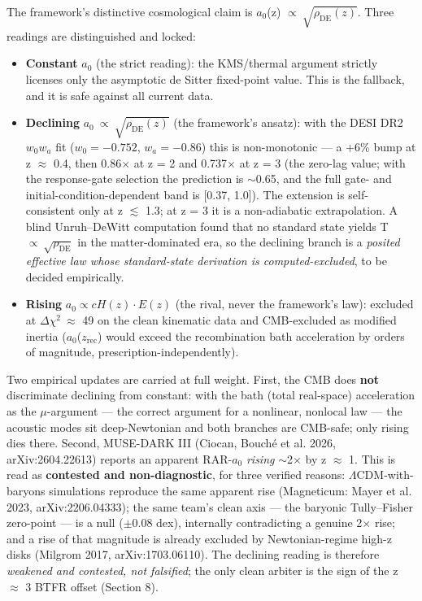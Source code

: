 \documentclass[11pt,a4paper]{article}
\begin{document}
The framework's distinctive cosmological claim is $a_{0}$(z) $\propto\ \sqrt{\rho_{\mathrm{DE}}(z)}$. Three readings are distinguished and locked:

\begin{itemize}
\item \textbf{Constant} $a_{0}$ (the strict reading): the KMS/thermal argument strictly licenses only the asymptotic de Sitter fixed-point value. This is the fallback, and it is safe against all current data.

\item \textbf{Declining} $a_{0}\ \propto\ \sqrt{\rho_{\mathrm{DE}}(z)}$ (the framework's ansatz): with the DESI DR2 $w_0w_a$ fit ($w_0 = -0.752$, $w_a = -0.86$) this is non-monotonic --- a +6\% bump at z $\approx$ 0.4, then 0.86$\times$ at z = 2 and 0.737$\times$ at z = 3 (the zero-lag value; with the response-gate selection the prediction is $\sim$0.65, and the full gate- and initial-condition-dependent band is [0.37, 1.0]). The extension is self-consistent only at z $\lesssim$ 1.3; at z = 3 it is a non-adiabatic extrapolation. A blind Unruh--DeWitt computation found that no standard state yields T $\propto\ \sqrt{\rho_{\mathrm{DE}}}$ in the matter-dominated era, so the declining branch is a \emph{posited effective law whose standard-state derivation is computed-excluded}, to be decided empirically.

\item \textbf{Rising} $a_0 \propto cH(z)\cdot E(z)$ (the rival, never the framework's law): excluded at $\Delta\chi^2\ \approx$ 49 on the clean kinematic data and CMB-excluded as modified inertia ($a_{0}$($z_{\mathrm{rec}}$) would exceed the recombination bath acceleration by orders of magnitude, prescription-independently).

\end{itemize}

Two empirical updates are carried at full weight. First, the CMB does \textbf{not} discriminate declining from constant: with the bath (total real-space) acceleration as the $\mu$-argument --- the correct argument for a nonlinear, nonlocal law --- the acoustic modes sit deep-Newtonian and both branches are CMB-safe; only rising dies there. Second, MUSE-DARK III (Ciocan, Bouch\'e et al. 2026, arXiv:2604.22613) reports an apparent RAR-$a_{0}$ \emph{rising} $\sim$2$\times$ by z $\approx$ 1. This is read as \textbf{contested and non-diagnostic}, for three verified reasons: $\Lambda$CDM-with-baryons simulations reproduce the same apparent rise (Magneticum: Mayer et al. 2023, arXiv:2206.04333); the same team's clean axis --- the baryonic Tully--Fisher zero-point --- is a null ($\pm$0.08 dex), internally contradicting a genuine 2$\times$ rise; and a rise of that magnitude is already excluded by Newtonian-regime high-z disks (Milgrom 2017, arXiv:1703.06110). The declining reading is therefore \emph{weakened and contested, not falsified}; the only clean arbiter is the sign of the z $\approx$ 3 BTFR offset (Section 8).
\end{document}
